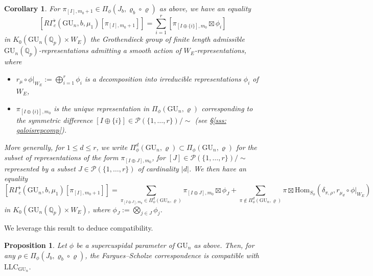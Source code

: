 \documentclass[reqno,11pt]{amsart}
\newtheorem{proposition}[theorem]{Proposition}
\newtheorem{corollary}[theorem]{Corollary}
\theoremstyle{remark}
\newcommand{\GU}{\mathrm{GU}}
\newcommand{\mc}{\mathcal}
\newcommand{\LLC}{\mathrm{LLC}}
\begin{document}
\begin{corollary}{\label{explicitstdmuKottwitzConj}}
For $\pi_{[I],m_0+1} \in \Pi_{\phi}(J_{b}, \varrho_b \circ \varrho)$ as above, we have an equality 
\[ [R\Gamma^{\flat}_{c}(\GU_n,b,\mu_{1})[\pi_{[I], m_0+1}]] = \sum_{i = 1}^{r} [\pi_{[I \oplus \{i\}],m_0} \boxtimes {\phi_{i}}]  \]
in $K_{0}(\GU_n(\mathbb{Q}_{p}) \times W_{E})$ the Grothendieck group of finite length admissible $\GU_n(\mathbb{Q}_{p})$-representations admitting a smooth action of $W_{E}$-representations, where
\begin{itemize}
    \item 
     $r_{\mu} \circ \phi|_{W_E} := \bigoplus_{i = 1}^{r} \phi_{i}$
is a decomposition into irreducible representations $\phi_{i}$ of $W_{E}$,
    \item $\pi_{[I \oplus \{i\}],m_0}$ is the unique representation in $\Pi_{\phi}(\GU_n, \varrho)$ corresponding to the symmetric difference $[I \oplus \{i\}] \in \mathcal{P}(\{1,\ldots,r\})/\sim$ (see \S\ref{sss: galoisrepcomp}).
    \end{itemize}
More generally, for $1 \leq d \leq r$, we write $\Pi^{d}_{\phi}(\GU_{n},\varrho) \subset \Pi_{\phi}(\GU_{n},\varrho)$ for the subset of representations of the form $\pi_{[I \oplus J],m_0}$, for $[J] \in \mc{P}(\{1,\ldots,r\})/\sim$ represented by a subset $J \in \mc{P}(\{1,\ldots,r\})$ of cardinality $|d|$. We then have an equality 
\[ [R\Gamma^{\flat}_{c}(\GU_n,b,\mu_{1})[\pi_{[I],m_0 + 1}]] = \sum_{\pi_{[I \oplus J],m_0} \in \Pi^{d}_{\phi}(\GU_{n},\varrho)} \pi_{[I \oplus J],m_0} \boxtimes \phi_{J}  +  \sum_{\pi \notin \Pi^{d}_{\phi}(\GU_{n},\varrho)} \pi \boxtimes \mathrm{Hom}_{S_{\phi}}(\delta_{\pi,\rho},r_{\mu_{d}}\circ \phi|_{W_{E}}) \]
in $K_{0}(\GU_n(\mathbb{Q}_{p}) \times W_{E})$, where $\phi_{J} := \bigotimes_{j \in J} \phi_{j}$. 
\end{corollary}
We leverage this result to deduce compatibility.
\begin{proposition}{\label{prop: case 1 compatibility}}
Let $\phi$ be a supercuspidal parameter of $\GU_n$ as above. Then, for any $\rho \in \Pi_{\phi}(J_{b},  \varrho_{b} \circ \varrho)$, the Fargues--Scholze correspondence is compatible with $\LLC_{\GU_n}$.
\end{proposition}
\end{document}
